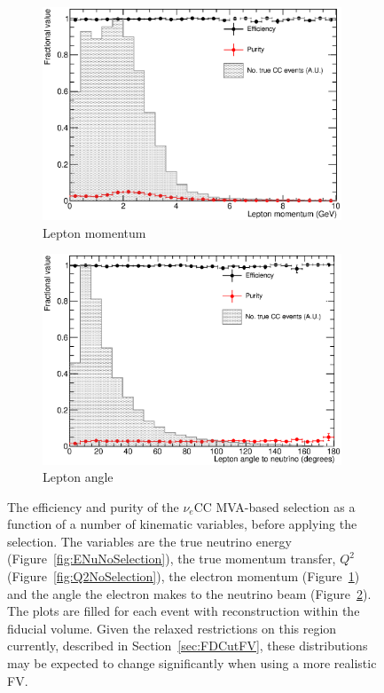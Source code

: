\begin{figure}
\begin{subfigure}[t]{0.48\linewidth}
    \includegraphics[width=0.98\textwidth]{LeptonMomentumNoSelection.eps}
    \caption{Lepton momentum}
    \label{fig:LeptonMomentumNoSelection}
  \end{subfigure}
  \hfill
  \begin{subfigure}[t]{0.48\linewidth}
    \centering
    \includegraphics[width=0.98\textwidth]{LeptonAngleNoSelection.eps}
    \caption{Lepton angle}
    \label{fig:LeptonAngleNoSelection}
  \end{subfigure}
  \caption[The efficiency and purity of the $\nu_e$CC MVA-based selection as a function of a number of kinematic variables, before applying the selection.]{The efficiency and purity of the $\nu_e$CC MVA-based selection as a function of a number of kinematic variables, before applying the selection.  The variables are the true neutrino energy (Figure~\ref{fig:ENuNoSelection}), the true momentum transfer, $Q^2$ (Figure~\ref{fig:Q2NoSelection}), the electron momentum (Figure~\ref{fig:LeptonMomentumNoSelection}) and the angle the electron makes to the neutrino beam (Figure~\ref{fig:LeptonAngleNoSelection}).  The plots are filled for each event with reconstruction within the fiducial volume.  Given the relaxed restrictions on this region currently, described in Section~\ref{sec:FDCutFV}, these distributions may be expected to change significantly when using a more realistic FV.}
  \label{fig:EffPurNoSelection}
\end{figure}

